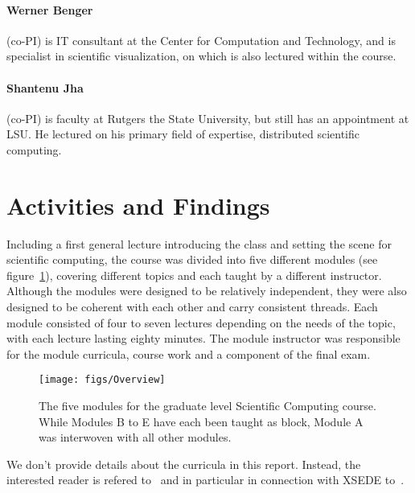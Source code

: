 \documentclass[11pt]{article}
\begin{document}
\paragraph{Werner Benger} (co-PI) is IT consultant at the Center for
Computation and Technology, and is specialist in scientific visualization,
on which is also lectured within the course.

\paragraph{Shantenu Jha} (co-PI) is faculty at Rutgers the State University,
but still has an appointment at LSU. He lectured on his primary field of expertise,
distributed scientific computing.

\section{Activities and Findings}

Including a first general lecture introducing the class and setting the scene
for scientific computing, the course was divided into five different modules
(see figure~\ref{fig:overview}),
covering different topics and each taught by a different instructor. Although the
modules were designed to be relatively independent, they were also
designed to be coherent with each other and carry consistent threads.  Each
module consisted of four to seven lectures depending on the needs of the
topic, with each lecture lasting eighty minutes.  The module instructor was
responsible for the module curricula, course work and a component of the final
exam.

\begin{figure}[t]
    \centerline{\texttt{[image: figs/Overview]}}
    \caption{\label{fig:overview}
      The five modules for the graduate level Scientific Computing course. While
      Modules B to E have each been taught as block, Module A was interwoven with
      all other modules.}
\end{figure}

We don't provide details about the curricula in this report. Instead, the
interested reader is refered to~\cite{FL-Allen2011a} and in particular in
connection with XSEDE to~\cite{FL-Loeffler2011tg}.
\end{document}
